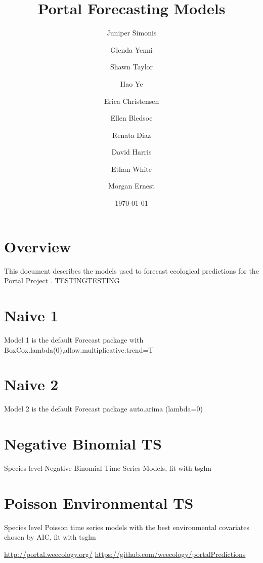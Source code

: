 \documentclass{article}
\title{Portal Forecasting Models}
\author[1]{Juniper Simonis}
\author[1]{Glenda Yenni}
\author[1]{Shawn Taylor}
\author[1]{Hao Ye}
\author[1]{Erica Christensen}
\author[1]{Ellen Bledsoe}
\author[1]{Renata Diaz}
\author[1]{David Harris}
\author[1]{Ethan White}
\author[1]{Morgan Ernest}
\affil[1]{Weecology Laboratory, University of Florida}
\date{\today}
\begin{document}
\maketitle
\tableofcontents

\section*{Overview}
\label{sec:overview}

This document describes the models used to forecast ecological predictions for the Portal Project \cite{portal, portalpredictions}. 
TESTINGTESTING 

\section{Naive 1}
\label{sec:naive01}

Model 1 is the default Forecast package with BoxCox.lambda(0),allow.multiplicative.trend=T

\section{Naive 2}
\label{sec:naive02}

Model 2 is the default Forecast package auto.arima (lambda=0)

\section{Negative Binomial TS}
\label{sec:neg_binom_ts}

Species-level Negative Binomial Time Series Models, fit with tsglm

\section{Poisson Environmental TS}
\label{sec:pois_env_ts}

Species level Poisson time series models with the best environmental covariates chosen by AIC, fit with tsglm

\begin{thebibliography}{9}
  \url{http://portal.weecology.org/}
  \url{https://github.com/weecology/portalPredictions}

\end{thebibliography}
\end{document}

